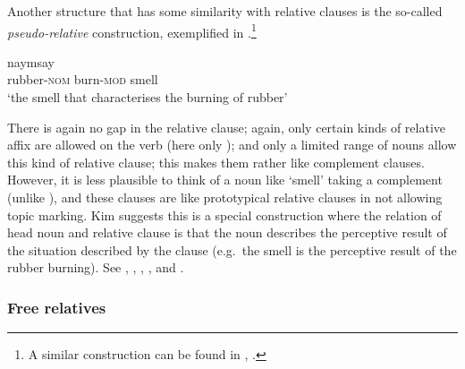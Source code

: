 \documentclass[output=paper
 	        ,biblatex
                ,babelshorthands
                ,newtxmath
                ,draftmode
                ,colorlinks, citecolor=brown
]{langscibook}
\begin{document}
Another  structure that has some similarity with relative clauses is the so-called
\emph{pseudo-relative} construction, exemplified in .\footnote{A similar
  construction can be found in , \citep[cf.][]{kikuta1998multiple,kikuta2001japanese,Kikuta2002a-u,Chan:Kim:03}.}
\begin{exe}\ex\label{x:rc-136}
  naymsay\\
      \hphantom{[}rubber-\textsc{nom} burn-\textsc{mod} smell\\
      \glt `the smell that characterises the burning of rubber' 
\end{exe}
There is again no gap in the relative clause; again, only certain kinds of relative
affix are allowed on the verb (here only ); and only a limited range of nouns allow this kind
of relative clause; this makes them rather like complement clauses.  However, it is less
plausible to think of a noun like  `smell' taking a complement (unlike
), and these clauses are like prototypical relative clauses in not allowing topic
marking. Kim suggests this is
a special construction where the relation of head noun and relative clause is that the
noun describes the perceptive result of the situation described by the clause (e.g.\ the
smell is the perceptive result of the rubber burning). See 
, , , , and .

\subsubsection{Free relatives}
\label{sec:rc-free-relatives}
\end{document}

